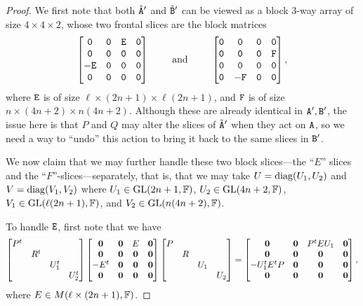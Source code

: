 \documentclass[11pt]{article}
\begin{document}
\begin{proof}
We first note that both $\tilde{\mathtt{A}}'$ and $\tilde {\mathtt{B}}'$ can be viewed as a block 3-way array of size 
$4\times 4\times 2$, whose two frontal slices are the block matrices 
\[\begin{bmatrix}
\mathtt{0} & \mathtt{0} & \mathtt{E} & \mathtt{0} \\
\mathtt{0} & \mathtt{0} & \mathtt{0} & \mathtt{0} \\
-\mathtt{E} & \mathtt{0} & \mathtt{0} & \mathtt{0} \\
\mathtt{0} & \mathtt{0} & \mathtt{0} & \mathtt{0} 
\end{bmatrix} 
\qquad\text{ and }\qquad 
\begin{bmatrix}
\mathtt{0} & \mathtt{0} & \mathtt{0} & \mathtt{0} \\
\mathtt{0} & \mathtt{0} & \mathtt{0} & \mathtt{F} \\
\mathtt{0} & \mathtt{0} & \mathtt{0} & \mathtt{0} \\
\mathtt{0} & -\mathtt{F} & \mathtt{0} & \mathtt{0} 
\end{bmatrix},
\]
where $\mathtt{E}$ is of size $\ell\times (2n+1)\times \ell(2n+1)$, and $\mathtt{F}$ is of size 
$n\times (4n+2)\times n(4n+2)$. 
Although these are already identical in $\mathtt{A}',\mathtt{B}'$, the issue here is that $P$ 
and $Q$ may alter the slices of $\tilde {\mathtt{A}}'$ when they act on $\mathtt{A}$, so we need a 
way to ``undo'' this action to bring it back to the same slices in $\mathtt{B}'$.

We now claim that we may further handle these two block slices---the ``$E$'' slices and the ``$F$''-slices---separately, that is, that we may take $U = \operatorname{diag}(U_1, U_2)$ and $V = \operatorname{diag}(V_1, V_2)$ where $U_1\in\mathrm{GL}(2n+1, \mathbb{F})$, $U_2\in \mathrm{GL}(4n+2, \mathbb{F})$, $V_1\in\mathrm{GL}(\ell(2n+1), \mathbb{F})$, and $V_2\in \mathrm{GL}(n(4n+2), \mathbb{F})$. 

To handle $\mathtt{E}$, first note that we have
\[
\begin{bmatrix}
P^t \\
 & R^t \\
  & & U_1^t \\
  & & & U_2^t
\end{bmatrix}
\begin{bmatrix}
\mathbf{0} & \mathbf{0} & E & \mathbf{0} \\
\mathbf{0} & \mathbf{0} & \mathbf{0} & \mathbf{0} \\
-E^t & \mathbf{0} & \mathbf{0} & \mathbf{0} \\
\mathbf{0} & \mathbf{0} & \mathbf{0} & \mathbf{0}
\end{bmatrix}
\begin{bmatrix}
P \\
 & R \\
  & & U_1 \\
  & & & U_2
\end{bmatrix}
=
\begin{bmatrix}
\mathbf{0} & \mathbf{0} & P^t E U_1 & \mathbf{0} \\
\mathbf{0} & \mathbf{0} & \mathbf{0} & \mathbf{0} \\
-U_1^t E^t P & \mathbf{0} & \mathbf{0} & \mathbf{0} \\
\mathbf{0} & \mathbf{0} & \mathbf{0} & \mathbf{0} 
\end{bmatrix},
\]
where $E \in M(\ell \times(2n+1), \mathbb{F})$.


\end{proof}
\end{document}
